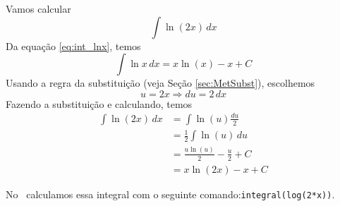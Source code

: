 \cleardoublepage\documentclass[../main.tex]{subfiles}
\begin{document}
\begin{ex}
  Vamos calcular
  \begin{equation*}
    \int \ln(2x)\,dx
  \end{equation*}
  Da equação \ref{eq:int_lnx}, temos
  \begin{equation*}
    \int \ln x\,dx = x\ln(x) - x + C
  \end{equation*}
  Usando a regra da substituição (veja Seção \ref{sec:MetSubst}), escolhemos
  \begin{equation*}
    u = 2x \Rightarrow du = 2\,dx
  \end{equation*}
  Fazendo a substituição e calculando, temos
  \begin{align*}
    \int \ln(2x)\,dx &= \int \ln(u)\frac{du}{2} \\
                     &= \frac{1}{2}\int \ln(u)\,du \\
                     &= \frac{u\ln(u)}{2} - \frac{u}{2} + C \\
                     &= x\ln(2x) - x + C
  \end{align*}

  
  No \geogebra~calculamos essa integral com o seguinte comando:\verb|integral(log(2*x))|.
\end{ex}
\end{document}

